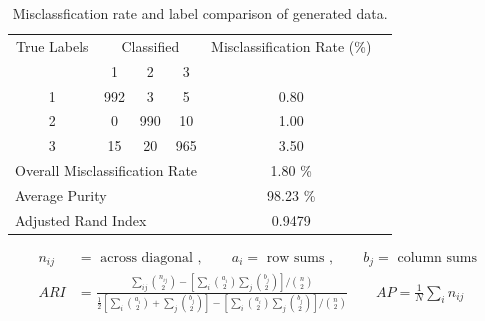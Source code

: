 \documentclass[11pt,letterpaper]{article}
\numberwithin{equation}{section}
\numberwithin{equation}{section}
\numberwithin{equation}{section}
\begin{document}
\begin{table}[!htb]
\begin{center}
\caption{Misclassfication rate and label comparison of generated data.}
\begin{tabular}{c c c c c c}
\hline\hline 
    True Labels       &  \multicolumn{3}{c}{ Classified }   & Misclassification Rate (\%) &  \\ \cmidrule{2-4}
   & 1                              & 2   & 3   &                            &  \\ \hline
1              & 992                            & 3   & 5   & 0.80                      &  \\
2              & 0                              & 990 & 10  & 1.00                       &  \\
3              & 15                             & 20  & 965 & 3.50                      &  \\  \hline 
                \multicolumn{4}{l}{Overall Misclassification Rate}        & 1.80 \%                     & \\
        		\multicolumn{4}{l}{Average Purity} & 98.23 \%  \\
                \multicolumn{4}{l}{Adjusted Rand Index} & 0.9479 &  \\
    \hline\hline  
\end{tabular}
\end{center}
\begin{align*}
n_{ij} &= \text{ across diagonal }, \quad\quad  a_i = \text{ row sums }, \quad\quad b_j = \text { column sums } \\
 ARI &= \frac{ \sum_{ij} \binom{n_{ij}}{2} - [\sum_i \binom{a_i}{2} \sum_j \binom{b_j}{2}] / \binom{n}{2} }{ \frac{1}{2} [\sum_i \binom{a_i}{2} + \sum_j \binom{b_j}{2}] - [\sum_i \binom{a_i}{2} \sum_j \binom{b_j}{2}] / \binom{n}{2} } \quad\quad AP = \frac{1}{N} \sum_i  n_{ij}  
\end{align*}
\end{table}
\end{document}
